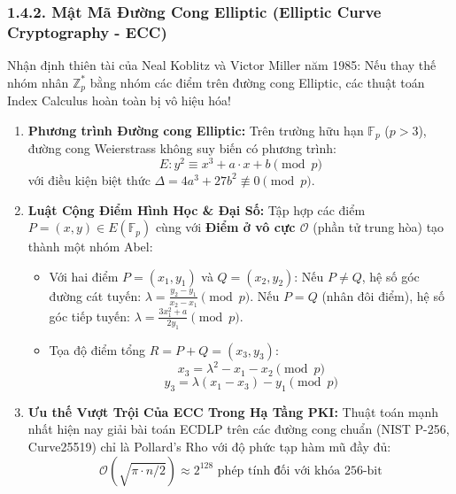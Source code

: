 \documentclass[
]{article}
\providecommand{\tightlist}{%
  \setlength{\itemsep}{0pt}\setlength{\parskip}{0pt}}
\begin{document}
\subsubsection{1.4.2. Mật Mã Đường Cong Elliptic (Elliptic Curve
Cryptography -
ECC)}\label{mux1eadt-muxe3-ux111ux1b0ux1eddng-cong-elliptic-elliptic-curve-cryptography---ecc}

Nhận định thiên tài của Neal Koblitz và Victor Miller năm 1985: Nếu thay
thế nhóm nhân \(\mathbb{Z}_p^*\) bằng nhóm các điểm trên đường cong
Elliptic, các thuật toán Index Calculus hoàn toàn bị vô hiệu hóa!

\begin{enumerate}
\def\labelenumi{\arabic{enumi}.}
\item
  \textbf{Phương trình Đường cong Elliptic:} Trên trường hữu hạn
  \(\mathbb{F}_p\) (\(p > 3\)), đường cong Weierstrass không suy biến có
  phương trình: \[E: y^2 \equiv x^3 + a \cdot x + b \pmod p\] với điều
  kiện biệt thức \(\Delta = 4a^3 + 27b^2 \not\equiv 0 \pmod p\).
\item
  \textbf{Luật Cộng Điểm Hình Học \& Đại Số:} Tập hợp các điểm
  \(P = (x, y) \in E(\mathbb{F}_p)\) cùng với \textbf{Điểm ở vô cực
  \(\mathcal{O}\)} (phần tử trung hòa) tạo thành một nhóm Abel:

  \begin{itemize}
  \tightlist
  \item
    Với hai điểm \(P = (x_1, y_1)\) và \(Q = (x_2, y_2)\): Nếu
    \(P \neq Q\), hệ số góc đường cát tuyến:
    \(\lambda = \frac{y_2 - y_1}{x_2 - x_1} \pmod p\). Nếu \(P = Q\)
    (nhân đôi điểm), hệ số góc tiếp tuyến:
    \(\lambda = \frac{3x_1^2 + a}{2y_1} \pmod p\).
  \item
    Tọa độ điểm tổng \(R = P + Q = (x_3, y_3)\):
    \[x_3 = \lambda^2 - x_1 - x_2 \pmod p\]
    \[y_3 = \lambda(x_1 - x_3) - y_1 \pmod p\]
  \end{itemize}
\item
  \textbf{Ưu thế Vượt Trội Của ECC Trong Hạ Tầng PKI:} Thuật toán mạnh
  nhất hiện nay giải bài toán ECDLP trên các đường cong chuẩn (NIST
  P-256, Curve25519) chỉ là Pollard's Rho với độ phức tạp hàm mũ đầy đủ:
  \[\mathcal{O}(\sqrt{\pi \cdot n / 2}) \approx 2^{128} \text{ phép tính đối với khóa 256-bit}\]
\end{enumerate}
\end{document}
